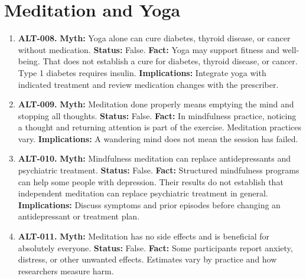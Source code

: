 \documentclass[11pt,oneside]{book}
\begin{document}
\section{Meditation and Yoga}
\begin{enumerate}[leftmargin=0pt,labelwidth=0pt,labelsep=0pt,itemindent=0pt]
\item[] \textbf{ALT-008.} \textbf{Myth:} Yoga alone can cure diabetes, thyroid disease, or cancer without medication.\newline
\textbf{Status:} False.\newline
\textbf{Fact:} Yoga may support fitness and well-being. That does not establish a cure for diabetes, thyroid disease, or cancer. Type 1 diabetes requires insulin. \cite{ref118,ref271}\newline
\textbf{Implications:} Integrate yoga with indicated treatment and review medication changes with the prescriber.
\item[] \textbf{ALT-009.} \textbf{Myth:} Meditation done properly means emptying the mind and stopping all thoughts.\newline
\textbf{Status:} False.\newline
\textbf{Fact:} In mindfulness practice, noticing a thought and returning attention is part of the exercise. Meditation practices vary. \cite{ref470}\newline
\textbf{Implications:} A wandering mind does not mean the session has failed.
\item[] \textbf{ALT-010.} \textbf{Myth:} Mindfulness meditation can replace antidepressants and psychiatric treatment.\newline
\textbf{Status:} False.\newline
\textbf{Fact:} Structured mindfulness programs can help some people with depression. Their results do not establish that independent meditation can replace psychiatric treatment in general. \cite{ref136,ref470}\newline
\textbf{Implications:} Discuss symptoms and prior episodes before changing an antidepressant or treatment plan.
\item[] \textbf{ALT-011.} \textbf{Myth:} Meditation has no side effects and is beneficial for absolutely everyone.\newline
\textbf{Status:} False.\newline
\textbf{Fact:} Some participants report anxiety, distress, or other unwanted effects. Estimates vary by practice and how researchers measure harm. \cite{ref134,ref470}\newline

\end{enumerate}
\end{document}
